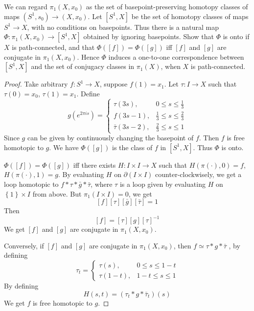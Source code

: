 \documentclass[../main.tex]{subfiles}
\begin{document}
\begin{proposition}{}{}
    We can regard \(\pi_{1}(X,x_{0})\) as the set of basepoint-preserving homotopy classes of maps \((S^{1},s_{0}) \to (X,x_{0})\). Let \([S^{1},X]\) be the set of homotopy classes of maps \(S^{1} \to X\), with no conditions on basepoints. Thus there is a natural map \(\Phi \colon \pi_{1}(X,x_{0}) \to [S^{1},X]\) obtained by ignoring basepoints. Show that \(\Phi\) is onto if \(X\) is path-connected, and that \(\Phi([f]) = \Phi([g])\) iff \([f]\) and \([g]\) are conjugate in \(\pi_{1}(X,x_{0})\). Hence \(\Phi\) induces a one-to-one correspondence between \([S^{1},X]\) and the set of conjugacy classes in \(\pi_{1}(X)\), when \(X\) is path-connected.
\end{proposition}

\begin{proof}
    Take arbitrary \(  f: S^{1}\to X  \), suppose \(  f\left( 1 \right)= x_1 \). Let \(  \tau :I \to X  \) such that \(  \tau \left( 0 \right)= x_0   \), \(  \tau \left( 1 \right)= x_{1}   \). Define \[
    g \left( e^{2 \pi is} \right) = \begin{cases} \tau \left( 3s \right),& 0\le s\le \frac{1}{3}\\ 
     f\left( 3s-1 \right),& \frac{1}{3}\le s\le \frac{2}{3}\\ 
      \bar{\tau}\left( 3s-2 \right),& \frac{2}{3}\le s\le 1      \end{cases} 
    \]    
  Since \(  g  \) can be  given by continuously changing the basepoint of \(  f  \).    Then \(  f  \) is free homotopic to \(  g  \). We have \(  \Phi \left( [g] \right)   \)   is the class of \(  f  \) in \(  [S^{1},X]  \). Thus \(  \Phi   \) is onto. 
    
    
 \(  \Phi \left( [f] \right)= \Phi \left( [g] \right)    \) iff there exists \(  H: I\times I\to X  \) such that \(  H\left(  \pi \left( \cdot  \right) ,0 \right)= f   \), \(  H\left(  \pi \left( \cdot  \right)  ,1 \right)= g   \).     
 By evaluating \(  H  \) on \(   \partial \left( I\times I \right)   \) counter-clockwisely, we get a loop homotopic to \(  f*\tau * \bar{g}* \bar{\tau}  \), where  \(  \tau   \) is a loop given by evaluating \(  H  \) on \(  \left\{ 1 \right\}\times I  \) from above.       But \(   \pi _1 \left( I\times I \right)= 0   \), we get \[
 [f][\tau ][\bar{g}][\bar{\tau}]= 1
 \]Then \[
 [f]= [\tau ][g][\tau ]^{-1} 
 \] We get \(  [f]  \) and \(  [g]  \) are conjugate in \(   \pi _1 \left( X,x_0 \right)   \).
 
 Conversely, if \(  [f]  \) and \(  [g]  \) are conjugate in \(   \pi _1 \left( X,x_0 \right)   \), then \(  f\simeq  \tau *g*\bar{\tau} \)    , by defining  \[
 \tau _{t}= \begin{cases} \tau \left( s \right),&0\le s\le 1-t\\ 
  \tau \left( 1-t \right),& 1-t\le s\le 1   \end{cases} 
 \]By defining \[
 H\left( s,t \right)= \left(\tau _{t}*g*\bar{\tau}_{t} \right) \left( s \right)  
 \] We get  \(  f  \) is free homotopic to \(  g  \).  
\end{proof}
\end{document}
